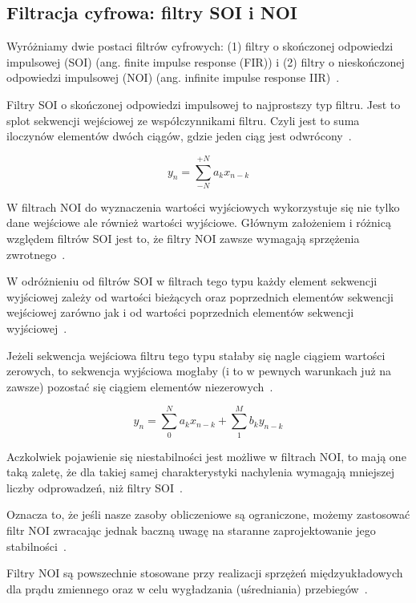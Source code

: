 \documentclass[wi]{zut}
\begin{document}
\subsection{Filtracja cyfrowa: filtry SOI i NOI}

Wyróżniamy dwie postaci filtrów cyfrowych: (1) filtry o skończonej odpowiedzi impulsowej (SOI) (ang. finite impulse response (FIR)) i (2) filtry o nieskończonej odpowiedzi impulsowej (NOI) (ang. infinite impulse response IIR)~\cite{Cariow_7}.

Filtry SOI o skończonej odpowiedzi impulsowej to najprostszy typ filtru. Jest to splot sekwencji wejściowej ze współczynnikami filtru. Czyli jest to suma iloczynów elementów dwóch ciągów, gdzie jeden ciąg jest odwrócony~\cite{Cariow_7}.

\begin{equation}
    y_{n}=\sum_{-N}^{+N} a_{k} x_{n-k}
\end{equation}

W filtrach NOI do wyznaczenia wartości wyjściowych wykorzystuje się nie tylko dane wejściowe ale również wartości wyjściowe. Głównym założeniem i różnicą względem filtrów SOI jest to, że filtry NOI zawsze wymagają sprzężenia zwrotnego~\cite{Cariow_7}.

W odróżnieniu od filtrów SOI w filtrach tego typu każdy element sekwencji wyjściowej zależy od wartości bieżących oraz poprzednich elementów sekwencji wejściowej zarówno jak i od wartości poprzednich elementów sekwencji wyjściowej~\cite{Cariow_7}.

Jeżeli sekwencja wejściowa filtru tego typu stałaby się nagle ciągiem wartości zerowych, to sekwencja wyjściowa mogłaby (i to w pewnych warunkach już na zawsze) pozostać się ciągiem elementów niezerowych~\cite{Cariow_7}.

\begin{equation}
    y_{n}=\sum_{0}^{N} a_{k} x_{n-k}+\sum_{1}^{M} b_{k} y_{n-k}
\end{equation}

Aczkolwiek pojawienie się niestabilności jest możliwe w filtrach NOI, to mają one taką zaletę, że dla takiej samej charakterystyki nachylenia wymagają mniejszej liczby odprowadzeń, niż filtry SOI~\cite{Cariow_7}.

Oznacza to, że jeśli nasze zasoby obliczeniowe są ograniczone, możemy zastosować filtr NOI zwracając jednak baczną uwagę na staranne zaprojektowanie jego stabilności~\cite{Cariow_7}.

Filtry NOI są powszechnie stosowane przy realizacji sprzężeń międzyukładowych dla prądu zmiennego oraz w celu wygładzania (uśredniania) przebiegów~\cite{Cariow_7}.
\end{document}
